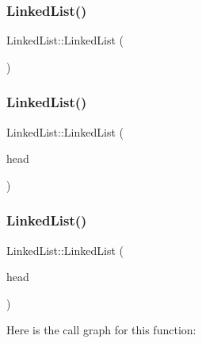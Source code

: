 \subsubsection{\texorpdfstring{Linked\+List()}{LinkedList()}\hspace{0.1cm}{\footnotesize\ttfamily [1/3]}}
{\footnotesize\ttfamily Linked\+List\+::\+Linked\+List (\begin{DoxyParamCaption}{ }\end{DoxyParamCaption})}

\mbox{\label{class_linked_list_ae4a0a3646caae0f7eedb6bd6d6744dbb}} 
\subsubsection{\texorpdfstring{Linked\+List()}{LinkedList()}\hspace{0.1cm}{\footnotesize\ttfamily [2/3]}}
{\footnotesize\ttfamily Linked\+List\+::\+Linked\+List (\begin{DoxyParamCaption}\item[{\hyperlink{class_node}{Node} $\ast$}]{head }\end{DoxyParamCaption})}

\mbox{\label{class_linked_list_a5dd2a88ad50e83aee19dea51c8d87d90}} 
\subsubsection{\texorpdfstring{Linked\+List()}{LinkedList()}\hspace{0.1cm}{\footnotesize\ttfamily [3/3]}}
{\footnotesize\ttfamily Linked\+List\+::\+Linked\+List (\begin{DoxyParamCaption}\item[{const \hyperlink{class_linked_list}{Linked\+List} \&}]{head }\end{DoxyParamCaption})}

Here is the call graph for this function\+:
\mbox{\label{class_linked_list_a35811ed58ff0d8d9cc9b309b8d8f5111}} 
